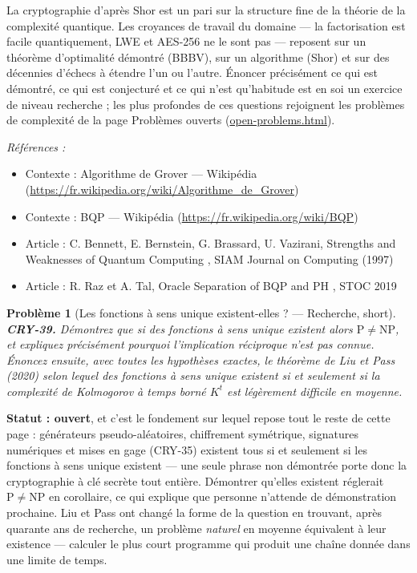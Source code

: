 \documentclass[11pt]{article}
\newtheorem{problem}{Problème}
\newenvironment{refs}{\par\small\noindent\emph{Références :}\begin{itemize}\setlength\itemsep{0pt}}{\end{itemize}\normalsize}
\begin{document}
\noindent La cryptographie d'après Shor est un pari sur la structure fine de la
théorie de la complexité quantique. Les croyances de travail du domaine --- la factorisation est
facile quantiquement, LWE et AES-256 ne le sont pas --- reposent sur un théorème d'optimalité
démontré (BBBV), sur un algorithme (Shor) et sur des décennies d'échecs à étendre l'un ou
l'autre. Énoncer précisément ce qui est démontré, ce qui est conjecturé et ce qui n'est
qu'habitude est en soi un exercice de niveau recherche ; les plus profondes de ces questions
rejoignent les problèmes de complexité de la page
Problèmes ouverts (\url{open-problems.html}).

\begin{refs}
\item Contexte : Algorithme de Grover --- Wikipédia (\url{https://fr.wikipedia.org/wiki/Algorithme_de_Grover})
\item Contexte : BQP --- Wikipédia (\url{https://fr.wikipedia.org/wiki/BQP})
\item Article : C. Bennett, E. Bernstein, G. Brassard, U. Vazirani, \og{} Strengths and Weaknesses of Quantum Computing \fg{}, SIAM Journal on Computing (1997)
\item Article : R. Raz et A. Tal, \og{} Oracle Separation of BQP and PH \fg{}, STOC 2019
\end{refs}

\bigskip

\begin{problem}[{Les fonctions à sens unique existent-elles ? --- Recherche, short}]
\textbf{CRY-39.} Démontrez que si des fonctions à sens unique existent
alors $\mathrm{P} \ne \mathrm{NP}$, et expliquez précisément pourquoi l'implication
réciproque n'est pas connue. Énoncez ensuite, avec toutes les hypothèses exactes, le théorème
de Liu et Pass (2020) selon lequel des fonctions à sens unique existent si et seulement si la
complexité de Kolmogorov à temps borné $K^{t}$ est légèrement difficile en moyenne.
\end{problem}

\noindent \textbf{Statut : ouvert}, et c'est le fondement sur lequel repose tout le
reste de cette page : générateurs pseudo-aléatoires, chiffrement symétrique, signatures
numériques et mises en gage (CRY-35) existent tous si et seulement si les fonctions à sens
unique existent --- une seule phrase non démontrée porte donc la cryptographie à clé secrète
tout entière. Démontrer qu'elles existent réglerait $\mathrm{P} \ne \mathrm{NP}$ en
corollaire, ce qui explique que personne n'attende de démonstration prochaine. Liu et Pass ont
changé la forme de la question en trouvant, après quarante ans de recherche, un problème
\textit{naturel} en moyenne équivalent à leur existence --- calculer le plus court programme qui
produit une chaîne donnée dans une limite de temps.
\end{document}
